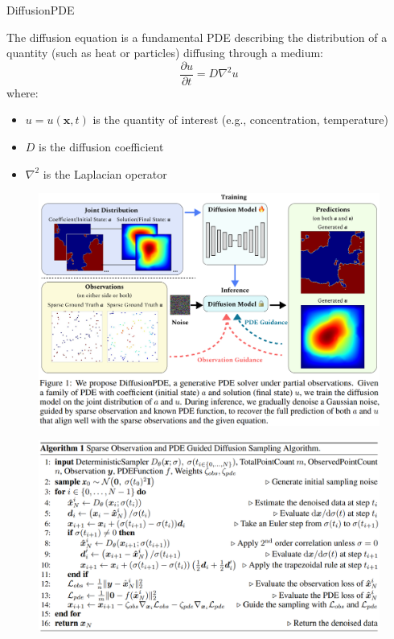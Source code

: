 \begin{frame}[allowframebreaks]{DiffusionPDE}

    The diffusion equation is a fundamental PDE describing the distribution of a quantity (such as heat or particles) diffusing through a medium:
    \begin{equation}
        \frac{\partial u}{\partial t} = D \nabla^2 u
    \end{equation}
    where:
    \begin{itemize}
        \item $u = u(\mathbf{x}, t)$ is the quantity of interest (e.g., concentration, temperature)
        \item $D$ is the diffusion coefficient
        \item $\nabla^2$ is the Laplacian operator
    \end{itemize}

    \framebreak

    \begin{figure}
        \centering
        \includegraphics[width=\linewidth,height=\textheight,keepaspectratio]{images/adv-img-gen/diffusionpde-1.png}
    \end{figure}

    \framebreak

    \begin{figure}
        \centering
        \includegraphics[width=\linewidth,height=\textheight,keepaspectratio]{images/adv-img-gen/diffusionpde-algo-1.png}
    \end{figure}


\end{frame}
